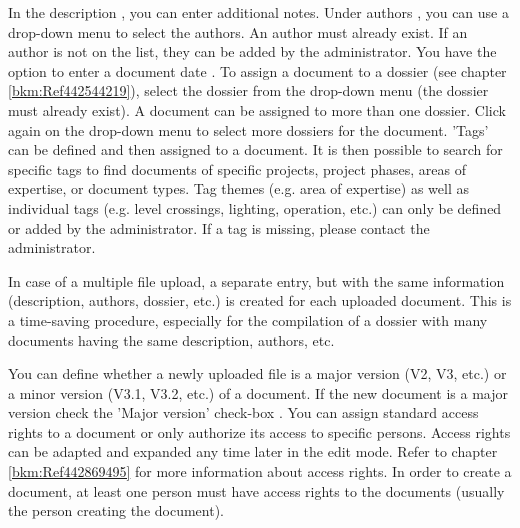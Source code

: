
In the description , you can enter additional notes. Under authors , you can use a drop-down menu to select the authors. An author must already exist. If an author is not on the list, they can be added by the administrator. You have the option to enter a document date . To assign a document to a dossier (see chapter \ref{bkm:Ref442544219}), select the dossier from the drop-down menu  (the dossier must already exist). A document can be assigned to more than one dossier. Click again on the drop-down menu to select more dossiers for the document. 'Tags'  can be defined and then assigned to a document. It is then possible to search for specific tags to find documents of specific projects, project phases, areas of expertise, or document types. Tag themes (e.g. area of expertise) as well as individual tags (e.g. level crossings, lighting, operation, etc.) can only be defined or added by the administrator. If a tag is missing, please contact the administrator. \newline

In case of a multiple file upload, a separate entry, but with the same information (description, authors, dossier, etc.) is created for each uploaded document. This is a time-saving procedure, especially for the compilation of a dossier with many documents having the same description, authors, etc. \newline


You can define whether a newly uploaded file is a major version (V2, V3, etc.) or a minor version (V3.1, V3.2, etc.) of a document. If the new document is a major version check the 'Major version' check-box . You can assign standard access rights to a document  or only authorize its access to specific persons. Access rights can be adapted and expanded any time later in the edit mode. Refer to chapter \ref{bkm:Ref442869495} for more information about access rights. In order to create a document, at least one person must have access rights to the documents (usually the person creating the document).

